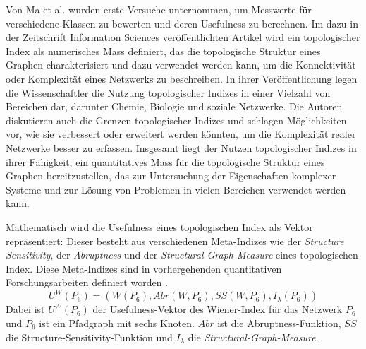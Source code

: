 Von Ma et al. \cite{ma_usefulness_2022} wurden erste Versuche unternommen, um Messwerte für verschiedene Klassen zu bewerten und deren Usefulness zu berechnen.
Im dazu in der Zeitschrift Information Sciences veröffentlichten Artikel \cite{ma_usefulness_2022} wird ein topologischer Index als numerisches Mass definiert, das die topologische Struktur eines Graphen charakterisiert und dazu verwendet werden kann, um die Konnektivität oder Komplexität eines Netzwerks zu beschreiben. 
In ihrer Veröffentlichung legen die Wissenschaftler die Nutzung topologischer Indizes in einer Vielzahl von Bereichen dar, darunter Chemie, Biologie und soziale Netzwerke. 
Die Autoren diskutieren auch die Grenzen topologischer Indizes und schlagen Möglichkeiten vor, wie sie verbessert oder erweitert werden könnten, um die Komplexität realer Netzwerke besser zu erfassen. 
Insgesamt liegt der Nutzen topologischer Indizes in ihrer Fähigkeit, ein quantitatives Mass für die topologische Struktur eines Graphen bereitzustellen, das zur Untersuchung der Eigenschaften komplexer Systeme und zur Lösung von Problemen in vielen Bereichen verwendet werden kann.

Mathematisch wird die Usefulness eines topologischen Index als Vektor repräsentiert:
Dieser besteht aus verschiedenen Meta-Indizes wie  der \textit{Structure Sensitivity}, der \textit{Abruptness} und der \textit{Structural Graph Measure} eines topologischen Index.
Diese Meta-Indizes sind in vorhergehenden quantitativen Forschungsarbeiten definiert worden \cite{furtula_structure-sensitivity_2013,dehmer_information_2012}.
\begin{equation}
    U^{W}(P_6) = (W(P_6), Abr(W, P_6), SS(W, P_6), I_{\lambda}(P_6))
\end{equation}
Dabei ist $U^W(P_6)$ der Usefulness-Vektor des Wiener-Index für das Netzwerk $P_6$ und $P_6$ ist ein Pfadgraph mit sechs Knoten.
$Abr$ ist die Abruptness-Funktion, $SS$ die Structure-Sensitivity-Funktion und $I_{\lambda}$ die \textit{Structural-Graph-Measure}.
